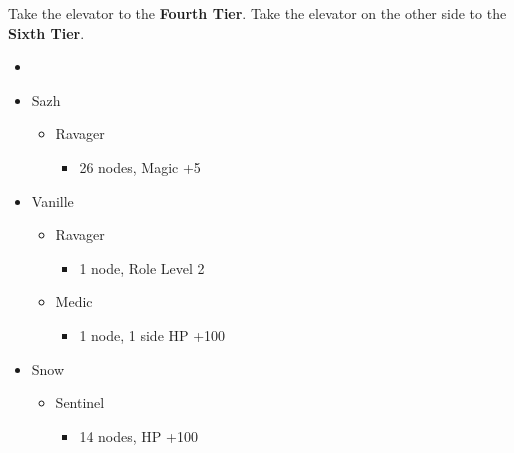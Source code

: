 	Take the elevator to the \textbf{Fourth Tier}.
	Take the elevator on the other side to the \textbf{Sixth Tier}.
	\begin{menu}
		\begin{itemize}
			\paradigm
			\begin{itemize}
				\item {}%
				      {\paradigmline[1]{\textit{\syn}}{\textit{\sab}}{\textit{\rav}}}%
				      {\paradigmline{\com}{\rav}{\rav}}%
				      {\paradigmline{\syn}{\med}{\com}}%
				      {\paradigmline{\com}{\med}{\com}}%
				      {\paradigmline{(\rav)}{\sab}{(\rav)}}%
				      {\paradigmline{\com}{\rav}{\com}}
			\end{itemize}
			\crystarium
			\begin{itemize}
				\item Sazh
				      \begin{itemize}
					      \item Ravager
					            \begin{itemize}
						            \item 26 nodes, Magic +5
					            \end{itemize}
				      \end{itemize}
				\item Vanille
				      \begin{itemize}
					      \item Ravager
					            \begin{itemize}
						            \item 1 node, Role Level 2
					            \end{itemize}
					      \item Medic
					            \begin{itemize}
						            \item 1 node, 1 side HP +100
					            \end{itemize}
				      \end{itemize}
				\item Snow
				      \begin{itemize}
					      \item Sentinel
					            \begin{itemize}
						            \item 14 nodes, HP +100
					            \end{itemize}
				      \end{itemize}

\end{itemize}
\end{itemize}
\end{menu}
